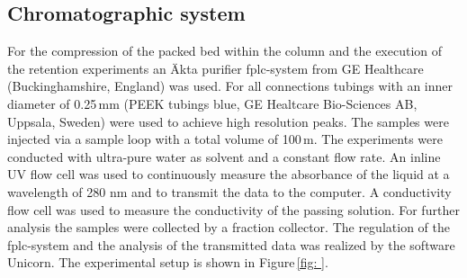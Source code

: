 % 
% 
%         


\subsection{Chromatographic system}
\label{subsec:chrom_sys}
For the compression of the packed bed within the column and the execution of the retention experiments an Äkta purifier \gls{fplc}-system from GE Healthcare (Buckinghamshire, England) was used. For all connections tubings with an inner diameter of 0.25\,mm (PEEK tubings blue, GE Healtcare Bio-Sciences AB, Uppsala, Sweden) were used to achieve high resolution peaks. The samples were injected via a sample loop with a total volume of 100\,\textmu m. The experiments were conducted with ultra-pure water as solvent and a constant flow rate. An inline UV flow cell was used to continuously measure the absorbance of the liquid at a wavelength of 280 nm and to transmit the data to the computer. A conductivity flow cell was used to measure the conductivity of the passing solution. For further analysis the samples were collected by a fraction collector. The regulation of the \gls{fplc}-system and the analysis of the transmitted data was realized by the software Unicorn. The experimental setup is shown in Figure\,\ref{fig:  }.

